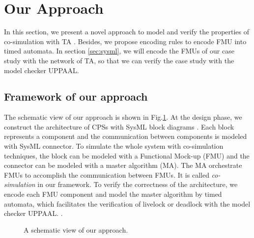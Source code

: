 \section{Our Approach}
In this section, we present a novel approach to model and verify the properties of co-simulation with TA \cite{AlurD94}. Besides, we propose encoding rules to encode FMU into timed automata. In section \ref{sec:sysml}, we will encode the FMUs of our case study with the network of TA, so that we can verify the case study with the model checker UPPAAL.
\label{sec:encoding}
\subsection{Framework of our approach}
The schematic view of our approach is shown in Fig.\ref{paper-arc}. At the design phase, we construct the architecture of CPSs with SysML block diagrams \cite{RahimHI17}. Each block represents a component and the communication between components is modeled with SysML connector. To simulate the whole system with co-simulation techniques, the block can be modeled with a Functional Mock-up (FMU) and the connector can be modeled with a master algorithm (MA). The MA orchestrate FMUs to accomplish the communication between FMUs. It is called \textit{co-simulation }in our framework. To verify the correctness of the architecture, we encode each FMU component and model the master algorithm by timed automata, which facilitates the verification of livelock or deadlock with the model checker UPPAAL. \cite{BehrmannDLHPYH06}.
\begin{figure}[htbp]
	\caption{A schematic view of our approach.}
	\label{paper-arc}
\end{figure}

